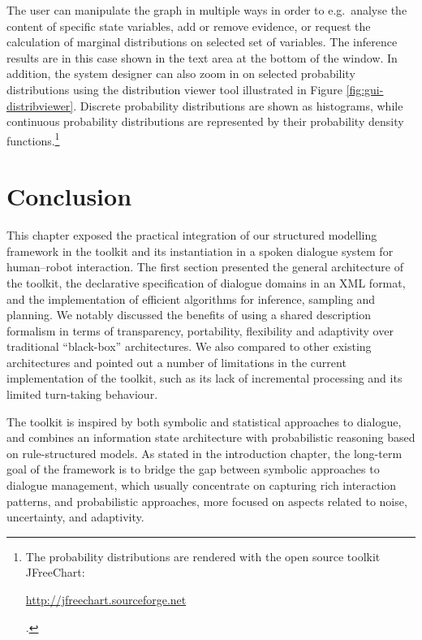 The user can manipulate the graph in multiple ways in order to e.g.\ analyse the content of specific state variables, add or remove evidence, or request the calculation of marginal distributions on selected set of variables.  The inference results are in this case shown in the text area at the bottom of the window.  In addition, the system designer can also zoom in on selected probability distributions using the distribution viewer tool illustrated in Figure \ref{fig:gui-distribviewer}. Discrete probability distributions are shown as histograms, while continuous probability distributions are represented by their probability density functions.\footnote{The probability distributions are rendered with the open source toolkit JFreeChart: \begin{scriptsize}\url{http://jfreechart.sourceforge.net}\end{scriptsize}.} 


\section{Conclusion}

This chapter exposed the practical integration of our structured modelling framework in the \opendial{} toolkit and its instantiation in a spoken dialogue system for human--robot interaction. The first section presented the general architecture of the toolkit, the declarative specification of dialogue domains in an XML format, and the implementation of efficient algorithms for inference, sampling and planning. We notably discussed the benefits of using a shared description formalism in terms of transparency, portability, flexibility and adaptivity over traditional ``black-box'' architectures. We also compared \opendial{} to other existing architectures and pointed out a number of limitations in the current implementation of the toolkit, such as its lack of incremental processing and its limited turn-taking behaviour. 

The \opendial{} toolkit is inspired by both symbolic and statistical approaches to dialogue, and combines an information state architecture with probabilistic reasoning based on rule-structured models.  As stated in the introduction chapter, the long-term goal of the \opendial{} framework is to bridge the gap between symbolic approaches to dialogue management, which usually concentrate on capturing rich interaction patterns, and probabilistic approaches, more focused on aspects related to noise, uncertainty, and adaptivity. 

